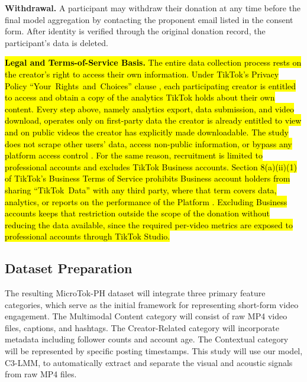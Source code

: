 \textbf{Withdrawal.} A participant may withdraw their donation at any time before the final model aggregation by contacting the proponent email listed in the consent form. After identity is verified through the original donation record, the participant's data is deleted. %

\hl{\textbf{Legal and Terms-of-Service Basis.} The entire data collection process rests on the creator's right to access their own information. Under TikTok's Privacy Policy \mbox{``Your Rights and Choices''} clause \mbox{\cite{tiktok_privacy_2026}}, each participating creator is entitled to access and obtain a copy of the analytics TikTok holds about their own content. Every step above, namely analytics export, data submission, and video download, operates only on first-party data the creator is already entitled to view and on public videos the creator has explicitly made downloadable. The study does not scrape other users' data, access non-public information, or bypass any platform access control \mbox{\cite{tiktok_tos_2026}}. For the same reason, recruitment is limited to professional accounts and excludes TikTok Business accounts. Section 8(a)(ii)(1) of TikTok's Business Terms of Service prohibits Business account holders from sharing \mbox{``TikTok Data''} with any third party, where that term covers data, analytics, or reports on the performance of the Platform \mbox{\cite{tiktok_business_tos_2026}}. Excluding Business accounts keeps that restriction outside the scope of the donation without reducing the data available, since the required per-video metrics are exposed to professional accounts through TikTok Studio.}

\subsection{Dataset Preparation}

The resulting MicroTok-PH dataset will integrate three primary feature categories, which serve as the initial framework for representing short-form video engagement. The Multimodal Content category will consist of raw MP4 video files, captions, and hashtags. The Creator-Related category will incorporate metadata including follower counts and account age. The Contextual category will be represented by specific posting timestamps. This study will use our model, C3-LMM, to automatically extract and separate the visual and acoustic signals from raw MP4 files. 


